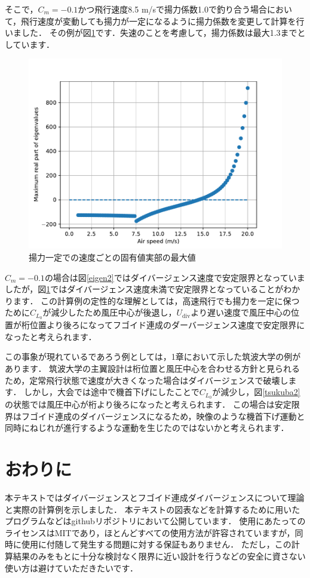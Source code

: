 \documentclass{jarticle}
\begin{document}
そこで，$C_m=-0.1$かつ飛行速度8.5 m/sで揚力係数1.0で釣り合う場合において，飛行速度が変動しても揚力が一定になるように揚力係数を変更して計算を行いました．
その例が図\ref{eigen3}です．失速のことを考慮して，揚力係数は最大1.3までとしています．
\begin{figure}[H]
    \centering
    \includegraphics[width=0.7\linewidth]{image/Eigenvalues_of_phugoid-divergence-modal-varCL-0.1.pdf}
    \caption{揚力一定での速度ごとの固有値実部の最大値}
    \label{eigen3}
\end{figure}
$C_m=-0.1$の場合は図\ref{eigen2}ではダイバージェンス速度で安定限界となっていましたが，図\ref{eigen3}ではダイバージェンス速度未満で安定限界となっていることがわかります．
この計算例の定性的な理解としては，高速飛行でも揚力を一定に保つために$C_{L_0}$が減少したため風圧中心が後退し，$U_\mathrm{div}$より遅い速度で風圧中心の位置が桁位置より後ろになってフゴイド連成のダーバージェンス速度で安定限界になったと考えられます．

この事象が現れているであろう例としては，1章において示した筑波大学の例があります．
筑波大学の主翼設計は桁位置と風圧中心を合わせる方針と見られるため，定常飛行状態で速度が大きくなった場合はダイバージェンスで破壊します．
しかし，大会では途中で機首下げにしたことで$C_{L_0}$が減少し，図\ref{tsukuba2}の状態では風圧中心が桁より後ろになったと考えられます．
この場合は安定限界はフゴイド連成のダイバージェンスになるため，映像のような機首下げ運動と同時にねじれが進行するような運動を生じたのではないかと考えられます．

\section{おわりに}

本テキストではダイバージェンスとフゴイド連成ダイバージェンスについて理論と実際の計算例を示しました．
本テキストの図表などを計算するために用いたプログラムなどはgithubリポジトリ\cite{git}において公開しています．
使用にあたってのライセンスはMITであり，ほとんどすべての使用方法が許容されていますが，同時に使用に付随して発生する問題に対する保証もありません．
ただし，この計算結果のみをもとに十分な検討なく限界に近い設計を行うなどの安全に資さない使い方は避けていただきたいです．
\end{document}
